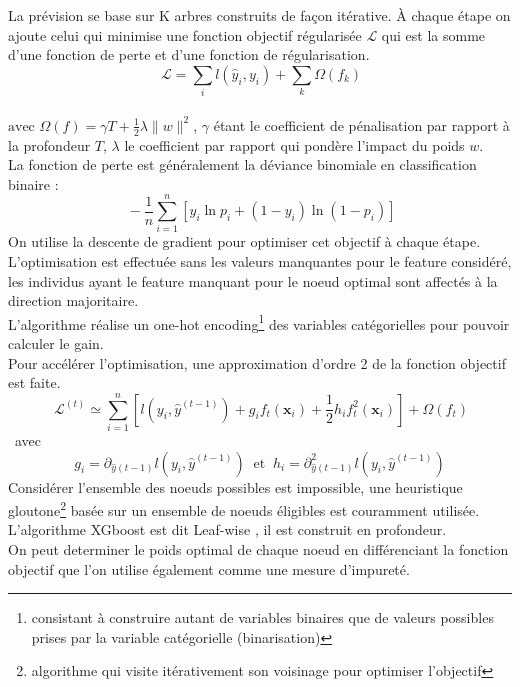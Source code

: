 \documentclass[french]{article}
\begin{document}
\begin{multicols}{2}
La prévision se base sur K arbres construits de façon itérative. À chaque étape on ajoute celui qui minimise une fonction objectif régularisée $\mathcal{L}$ qui est la somme d'une fonction de perte et d'une fonction de régularisation\footnotemark[11].\\
\[\ \mathcal{L}=\sum_{i} l\left(\hat{y}_{i}, y_{i}\right)+\sum_{k} \Omega\left(f_{k}\right) \]\\
$\text {avec } \Omega(f)=\gamma T+\frac{1}{2} \lambda\|w\|^{2}$, $\gamma$ étant le coefficient de pénalisation par rapport à la profondeur $T$, $\lambda$ le coefficient par rapport qui pondère l'impact du poids $w$.
\\
La fonction de perte est généralement la déviance binomiale en classification binaire :\\
 \[\ -\frac{1}{n} \sum_{i=1}^{n} \left[y_{i} \ln p_{i}+\left(1-y_{i}\right) \ln \left(1-p_{i}\right)\right] \]
On utilise la descente de gradient pour optimiser cet objectif à chaque étape.\\
L'optimisation est effectuée sans les valeurs manquantes pour le feature considéré, les individus ayant le feature manquant pour le noeud optimal sont affectés à la direction majoritaire.\\
L'algorithme réalise un one-hot encoding\footnote{consistant à construire autant de variables binaires que de valeurs possibles prises par la variable catégorielle (binarisation)} des variables catégorielles pour pouvoir calculer le gain.\\
Pour accélérer l'optimisation, une approximation d'ordre 2 de la fonction objectif est faite\footnotemark[11].\\
\[\ \mathcal{L}^{(t)} \simeq \sum_{i=1}^{n}\left[l\left(y_{i}, \hat{y}^{(t-1)}\right)+g_{i} f_{t}\left(\mathbf{x}_{i}\right)+\frac{1}{2} h_{i} f_{t}^{2}\left(\mathbf{x}_{i}\right)\right]+\Omega\left(f_{t}\right) \]\ 
avec  
\[ g_{i}=\partial_{\hat{y}(t-1)} l\left(y_{i}, \hat{y}^{(t-1)}\right) \ \text{ et } \ h_{i}=\partial_{\hat{y}(t-1)}^{2} l\left(y_{i}, \hat{y}^{(t-1)}\right)\]
Considérer l'ensemble des noeuds possibles est impossible, une heuristique gloutone\footnote{algorithme qui visite itérativement son voisinage pour optimiser l'objectif} basée sur un ensemble de noeuds éligibles est couramment utilisée.\\
L'algorithme XGboost est dit \og Leaf-wise \fg{}, il est construit en profondeur.\\
On peut determiner le poids optimal de chaque noeud en différenciant la fonction objectif que l'on utilise également comme une mesure d'impureté.\\

\end{multicols}
\end{document}
